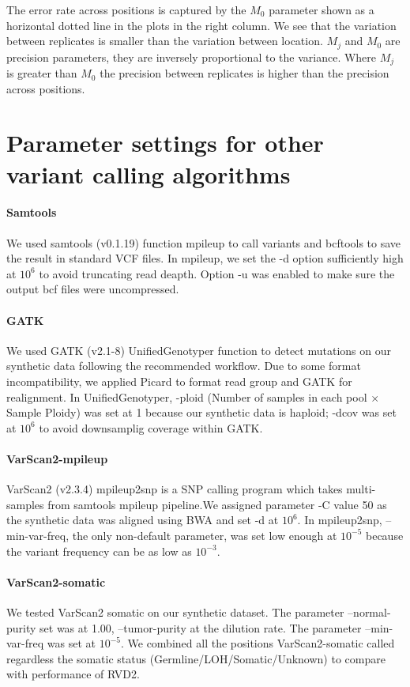 \documentclass[11pt,reqno]{amsart}
\begin{document}
The error rate across positions is captured by the $M_0$ parameter shown as a horizontal dotted line in the plots in the right column. We see that the variation between replicates is smaller than the variation between location. $M_j$ and $M_0$ are precision parameters, they are inversely proportional to the variance. Where $M_j$ is greater than $M_0$ the precision between replicates is higher than the precision across positions.


\section{Parameter settings for other variant calling algorithms}
\paragraph{\textbf{Samtools}}We used samtools (v0.1.19) function mpileup to call variants and bcftools to save the result in standard VCF files. In mpileup, we set the -d option sufficiently high at $10^6$ to avoid truncating read deapth. Option -u was enabled to make sure the output bcf files were uncompressed. 

\paragraph{\textbf{GATK}}
We used GATK (v2.1-8) UnifiedGenotyper function to detect mutations on our synthetic data following the recommended workflow. Due to some format incompatibility, we applied Picard to format read group and GATK for realignment. In UnifiedGenotyper, -ploid (Number of samples in each pool $\times$ Sample Ploidy) was set at 1 because our synthetic data is haploid; -dcov was set at $10^6$ to avoid downsamplig coverage within GATK.

\paragraph{\textbf{VarScan2-mpileup}}
VarScan2 (v2.3.4) mpileup2snp is a SNP calling program which takes multi-samples from samtools mpileup pipeline.We assigned parameter -C value 50 as the synthetic data was aligned using BWA and set -d at $10^6$. In mpileup2snp, --min-var-freq, the only non-default parameter, was set low enough at $10^{-5}$ because the variant frequency can be as low as $10^{-3}$. 

\paragraph{\textbf{VarScan2-somatic}}
We tested VarScan2 somatic on our synthetic dataset. The parameter --normal-purity set was at 1.00, --tumor-purity at the dilution rate. The parameter --min-var-freq was set at $10^{-5}$. We combined all the positions VarScan2-somatic called regardless the somatic status (Germline/LOH/Somatic/Unknown) to compare with performance of RVD2.
\end{document}
